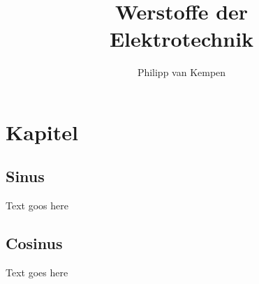 \documentclass[german]{latex4ei/latex4ei_sheet}
\title{Werstoffe der\\Elektrotechnik}
\author{Philipp van Kempen}					%
\begin{document}
\maketitle   %


\section{Kapitel}


\begin{sectionbox}
	\subsection{Sinus}
	
	Text goos here 
	
	
\end{sectionbox}


\begin{sectionbox}
	\subsection{Cosinus}
	
	Text goes here
	
	
\end{sectionbox}





\end{document}
